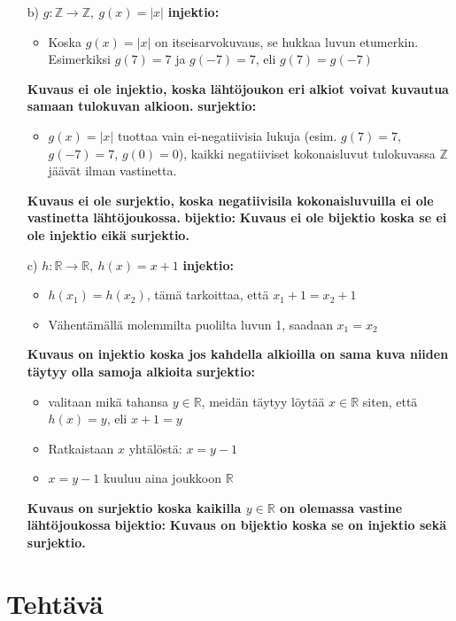 \documentclass{article}
\newcounter{tehtava}
\begin{document}
\begin{itemize}
            \item[b)] $g : \mathbb{Z} \rightarrow \mathbb{Z}, \ g(x) = |x|$\newline
            \textbf{injektio:}
            \begin{itemize}
                \item Koska $g(x) = |x|$ on itseisarvokuvaus, se hukkaa luvun etumerkin. Esimerkiksi $g(7) = 7$ ja $g(-7) = 7$, eli $g(7) = g(-7)$
            \end{itemize}
            \textbf{Kuvaus ei ole injektio, koska lähtöjoukon eri alkiot voivat kuvautua samaan tulokuvan alkioon.}\newline
            \textbf{surjektio:}
            \begin{itemize}
                \item $g(x) = |x|$ tuottaa vain ei-negatiivisia lukuja (esim. $g(7) = 7$, $g(-7) = 7$, $g(0) = 0$), kaikki negatiiviset kokonaisluvut tulokuvassa $\mathbb{Z}$ jäävät ilman vastinetta.
            \end{itemize}
            \textbf{Kuvaus ei ole surjektio, koska negatiivisila kokonaisluvuilla ei ole vastinetta lähtöjoukossa.}\newline
            \textbf{bijektio:}\newline
            \textbf{Kuvaus ei ole bijektio koska se ei ole injektio eikä surjektio.}
\pagebreak
            \item[c)] $h : \mathbb{R} \rightarrow \mathbb{R}, \ h(x) = x + 1$\newline
            \textbf{injektio:}
            \begin{itemize}
                \item $h(x_1) = h(x_2)$, tämä tarkoittaa, että $x_1 + 1 = x_2 + 1$
                \item Vähentämällä molemmilta puolilta luvun 1, saadaan $x_1 = x_2$
            \end{itemize}
            \textbf{Kuvaus on injektio koska jos kahdella alkioilla on sama kuva niiden täytyy olla samoja alkioita}\newline
            \textbf{surjektio:}
            \begin{itemize}
                \item valitaan mikä tahansa $y \in \mathbb{R}$, meidän täytyy löytää $x \in \mathbb{R}$ siten, että $h(x) = y$, eli $x + 1 = y$
                \item Ratkaistaan $x$ yhtälöstä: $x = y - 1$
                \item $x = y - 1$ kuuluu aina joukkoon $\mathbb{R}$
            \end{itemize}
            \textbf{Kuvaus on surjektio koska kaikilla $y \in \mathbb{R}$ on olemassa vastine lähtöjoukossa}\newline
            \textbf{bijektio:}\newline
            \textbf{Kuvaus on bijektio koska se on injektio sekä surjektio.}
        \end{itemize}
    
    \newpage
    \section*{Tehtävä \thetehtava}
    
\end{document}

